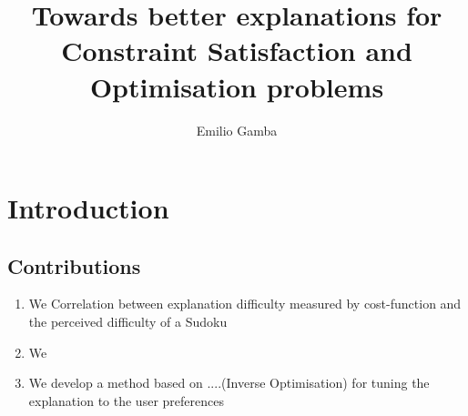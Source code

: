 \documentclass[a4paper,UKenglish,cleveref, autoref, cleveref, thm-restate,pdfa]{lipics-v2021}
\title{Towards better explanations for Constraint Satisfaction and Optimisation problems} %
\author{Emilio Gamba}{Data Analytics Lab - DTAI, VUB - KU Leuven, Belgium}{emilio.gamba@vub.be}{[0000-0003-1720-9428]}{}
\begin{document}
\maketitle	

\begin{abstract}

\end{abstract}

	\section{Introduction}
	
	\subsection{Contributions}
	\begin{enumerate}
		\item We Correlation between explanation difficulty measured by cost-function and the perceived difficulty of a Sudoku
		\item We 
		\item We develop a method based on ....(Inverse Optimisation) for tuning the explanation to the user preferences 
	\end{enumerate}
	
	
	
	
\end{document}
